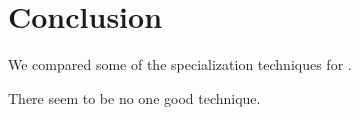 \section{Conclusion}

We compared some of the specialization techniques for \mk{}.

There seem to be no one good technique.
